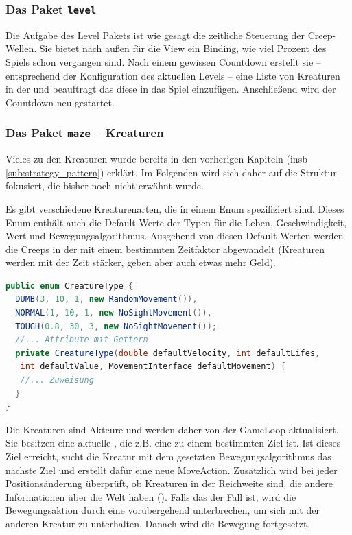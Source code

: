 \subsubsection{Das Paket \texttt{level}} %
\label{ssub:level}

Die Aufgabe des Level Pakets ist wie gesagt die zeitliche Steuerung der Creep-Wellen. Sie bietet nach außen für die View ein Binding, wie viel Prozent des Spiels schon vergangen sind. Nach einem gewissen Countdown erstellt sie -- entsprechend der Konfiguration des aktuellen Levels -- eine Liste von Kreaturen in der  und beauftragt das  diese in das Spiel einzufügen. Anschließend wird der Countdown neu gestartet.


\subsubsection{Das Paket \texttt{maze} -- Kreaturen} %
\label{ssub:maze_kreaturen}
Vieles zu den Kreaturen wurde bereits in den vorherigen Kapiteln (insb \ref{sub:strategy_pattern}) erklärt. Im Folgenden wird sich daher auf die Struktur fokusiert, die bisher noch nicht erwähnt wurde.

Es gibt verschiedene Kreaturenarten, die in einem Enum  spezifiziert sind. Dieses Enum enthält auch die Default-Werte der Typen für die Leben, Geschwindigkeit, Wert und Bewegungsalgorithmus. Ausgehend von diesen Default-Werten werden die Creeps in der  mit einem bestimmten Zeitfaktor abgewandelt (Kreaturen werden mit der Zeit stärker, geben aber auch etwas mehr Geld).

\begin{lstlisting}[language=Java]
public enum CreatureType {
  DUMB(3, 10, 1, new RandomMovement()),
  NORMAL(1, 10, 1, new NoSightMovement()),
  TOUGH(0.8, 30, 3, new NoSightMovement());
  //... Attribute mit Gettern
  private CreatureType(double defaultVelocity, int defaultLifes,
   int defaultValue, MovementInterface defaultMovement) {
   //... Zuweisung
  }
}
\end{lstlisting}

Die Kreaturen sind Akteure und werden daher von der GameLoop aktualisiert. Sie besitzen eine aktuelle , die z.B. eine  zu einem bestimmten Ziel ist. Ist dieses Ziel erreicht, sucht die Kreatur mit dem gesetzten Bewegungsalgorithmus das nächste Ziel und erstellt dafür eine neue MoveAction. Zusätzlich wird bei jeder Positionsänderung überprüft, ob Kreaturen in der Reichweite sind, die andere Informationen über die Welt haben (). Falls das der Fall ist, wird die Bewegungsaktion durch eine  vorübergehend unterbrechen, um sich mit der anderen Kreatur zu unterhalten. Danach wird die Bewegung fortgesetzt.

